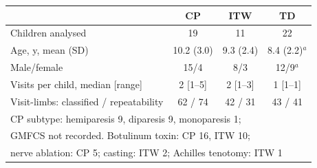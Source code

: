 \begin{tabular}{lccc}
\toprule
 & CP & ITW & TD \\
\midrule
Children analysed & 19 & 11 & 22 \\
Age, y, mean (SD) & 10.2 (3.0) & 9.3 (2.4) & 8.4 (2.2)$^a$ \\
Male/female & 15/4 & 8/3 & 12/9$^a$ \\
Visits per child, median [range] & 2 [1--5] & 2 [1--3] & 1 [1--1] \\
Visit-limbs: classified / repeatability & 62 / 74 & 42 / 31 & 43 / 41 \\
\midrule
\multicolumn{4}{l}{CP subtype: hemiparesis 9, diparesis 9, monoparesis 1;} \\
\multicolumn{4}{l}{GMFCS not recorded. Botulinum toxin: CP 16, ITW 10;} \\
\multicolumn{4}{l}{nerve ablation: CP 5; casting: ITW 2; Achilles tenotomy: ITW 1} \\
\bottomrule
\end{tabular}
